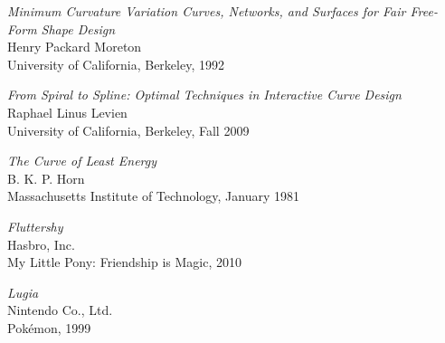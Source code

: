 \documentclass[a4paper]{article}
\begin{document}
	\begin{thebibliography}{}

			\emph{Minimum Curvature Variation Curves, Networks, and Surfaces for Fair Free-Form Shape Design}\\
			Henry Packard Moreton\\
			University of California, Berkeley, 1992

			\emph{From Spiral to Spline: Optimal Techniques in Interactive Curve Design}\\
			Raphael Linus Levien\\
			University of California, Berkeley, Fall 2009

			\emph{The Curve of Least Energy}\\
			B. K. P. Horn\\
			Massachusetts Institute of Technology, January 1981

			\emph{Fluttershy}\\
			Hasbro, Inc.\\
			My Little Pony: Friendship is Magic, 2010

			\emph{Lugia}\\
			Nintendo Co., Ltd.\\
			Pokémon, 1999

	\end{thebibliography}
\end{document}

